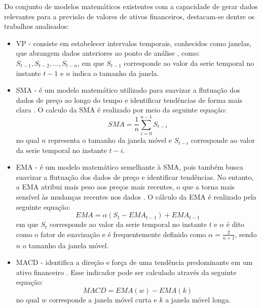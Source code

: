 Do conjunto de modelos matemáticos existentes com a capacidade de gerar dados relevantes para a previsão de valores de ativos financeiros, destacam-se dentre os trabalhos analisados:
\begin{itemize}
    \item \ac{VP} - consiste em estabelecer intervalos temporais, conhecidos como janelas, que abrangem dados anteriores ao ponto de análise \cite{Vinicius_Sistemas, gabriel2023neo}, como: $S_{t-1}, S_{t-2}, ..., S_{t-n}$, em que $S_{t-1}$ corresponde ao valor da serie temporal no instante $t-1$ e $n$ indica o tamanho da janela.
    
    \item \ac{SMA} - é um modelo matemático utilizado para suavizar a flutuação dos dados de preço ao longo do tempo e identificar tendências de forma mais clara \cite{Vinicius_Sistemas, Ciniro_Econometric}. O calculo da \ac{SMA} é realizado por meio da seguinte equação:
    \begin{equation}
    \label{eq:SMA}
        SMA = \frac{1}{n} \sum_{i=0}^{n-1} S_{t-i}
    \end{equation}
    no qual $n$ representa o tamanho da janela móvel e $S_{t-i}$ corresponde ao valor da serie temporal no instante $t-i$.
    
    \item \ac{EMA} - é um modelo matemático semelhante à \ac{SMA}, pois também busca suavizar a flutuação dos dados de preço e identificar tendências. No entanto, a EMA atribui mais peso aos preços mais recentes, o que a torna mais sensível às mudanças recentes nos dados \cite{Charlene}. O cálculo da \ac{EMA} é realizado pela seguinte equação:
    \begin{equation}
        \label{eq:EMA}
        EMA = \alpha (S_t - EMA_{t-1}) + EMA_{t-1}
    \end{equation}
    em que $S_t$ corresponde ao valor da serie temporal no instante $t$ e $\alpha$ é dito como o fator de suavização e é frequentemente definido como $\alpha = \frac{2}{n+1}$, sendo $n$ o tamanho da janela móvel. 
    
    \item \ac{MACD} - identifica a direção e força de uma tendência predominante em um ativo financeiro \cite{C_Veeramani_Exploration}. Esse indicador pode ser calculado através da seguinte equação: 
    \begin{equation}
        \label{eq:MACD}
        MACD = EMA(w) - EMA(k)
    \end{equation}
    no qual $w$ corresponde a janela móvel curta e $k$ a janela móvel longa.
    

\end{itemize}
